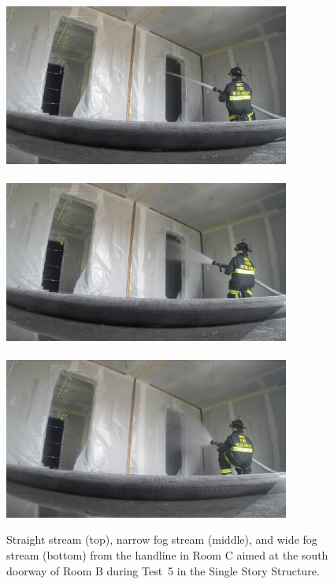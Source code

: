 \documentclass[12pt,oneside]{book}
\begin{document}
\begin{figure}[!ht]
	\includegraphics[trim=23cm 6.5cm 4cm 6cm, clip=true, width=3.70in]{../Figures/Pictures/SS_Room_B_Test_34}
	\\~\\
	\includegraphics[trim=23cm 6.5cm 4cm 6cm, clip=true, width=3.70in]{../Figures/Pictures/NF_Room_B_Test_34}
	\\~\\
	\includegraphics[trim=23cm 6.5cm 4cm 6cm, clip=true, width=3.70in]{../Figures/Pictures/WF_Room_B_Test_34}
	\caption[Straight stream, narrow fog stream, and wide fog stream during Test~5.]{Straight stream (top), narrow fog stream (middle), and wide fog stream (bottom) from the handline in Room C aimed at the south doorway of Room B during Test~5 in the Single Story Structure.}
	\label{fig:test_5_pic}
\end{figure}
\end{document}
